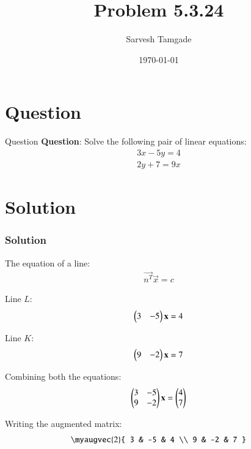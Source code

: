 \documentclass{beamer}
\title{Problem 5.3.24}
\author{Sarvesh Tamgade}
\date{\today}
\numberwithin{equation}{section}
\begin{document}
\begin{frame}
\titlepage
\end{frame}

\section{Question}
\begin{frame}{Question}
\textbf{Question}:
Solve the following pair of linear equations:
\begin{align}
   3x - 5y = 4 
\end{align}
\begin{align}
    2y + 7 = 9x
\end{align}
\end{frame}

\section{Solution}
\begin{frame}[fragile]
    \frametitle{Solution}
The equation of a line:
\begin{align}
\vec{n^T} \vec{x} = c
\end{align}

Line \(L\):
\begin{align}
\begin{pmatrix}3 & -5\end{pmatrix} \mathbf{x} = 4
\end{align}

Line \(K\):
\begin{align}
\begin{pmatrix}9 & -2\end{pmatrix} \mathbf{x} = 7
\end{align}

Combining both the equations:
\begin{align}
\begin{pmatrix}3 & -5 \\ 9 & -2\end{pmatrix} \mathbf{x} = \begin{pmatrix}4 \\ 7\end{pmatrix}
\end{align}

Writing the augmented matrix:
\begin{align}
\myaugvec{2}{
3 & -5 & 4 \\
9 & -2 & 7
}
\end{align}

\end{frame}
\end{document}
